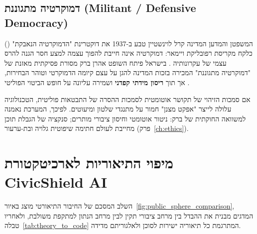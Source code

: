 \subsection{דמוקרטיה מתגוננת (Militant / Defensive Democracy)}
המשפטן והמדען המדינה קרל לוינשטיין טבע ב-1937 את דוקטרינת "הדמוקרטיה הנאבקת" () כלקח מקריסת רפובליקת ויימאר: דמוקרטיה אינה חייבת להפוך עצמה למצע חסר הגנה להרס עצמי של עקרונותיה \cite{loewenstein1937}. בישראל פיתח השופט אהרן ברק מסורת פסיקתית מאזנת של "דמוקרטיה מתגוננת" המכירה בזכות המדינה להגן על עצם קיומה הדמוקרטי וטוהר הבחירות, אך תוך \textbf{ריסון מידתי קפדני} ושמירה עליונה על חופש הביטוי הפוליטי \cite{barak1988}.

\begin{riskbox}
אם סמכות הזיהוי של  תקושר אוטומטית לסמכות ההסרה של התבטאות פוליטית, הטכנולוגיה עלולה לייצר "אפקט מצנן" חמור על מתנגדי שלטון ומיעוטים. לפיכך, המערכת נאמנה למשוואה החוקתית של ברק: ניטור אוטומטי וחיסון ציבורי מותרים; סנקציה של הגבלת תוכן מחייבת לעולם חתימה שיפוטית גלויה ובת-ערעור (פרק~\ref{ch:ethics}).
\end{riskbox}

\section{מיפוי התיאוריות לארכיטקטורת CivicShield AI}
השלב המסכם של החיבור התיאורטי מוצג באיור~\ref{fig:public_sphere_comparison}, המדגים מבנית את ההבדל בין מרחב ציבורי תקין לבין מרחב הנתון למתקפת  משולבת, ולאחריו טבלה~\ref{tab:theory_to_code} המתרגמת כל תיאוריה ישירות לסוכן  ולאלגוריתם מדידה.


